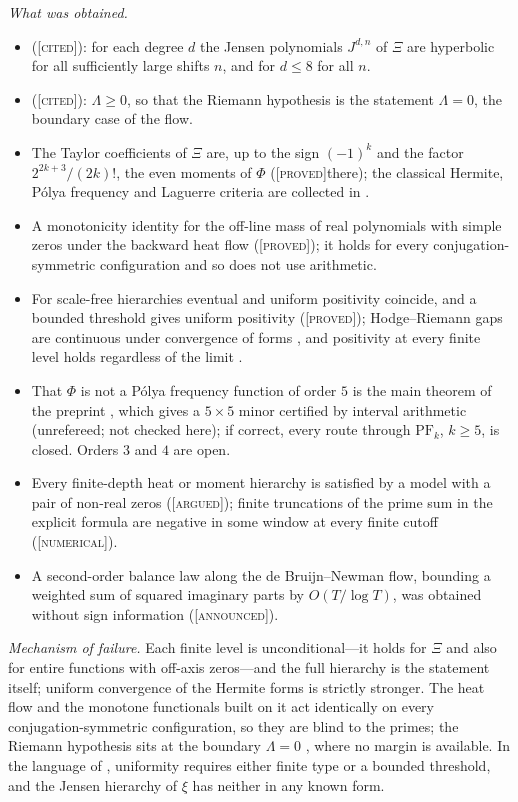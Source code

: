 \documentclass[11pt]{amsart}
\theoremstyle{definition}
\theoremstyle{remark}
\numberwithin{equation}{section}
\newcommand{\stag}[1]{\textsc{[#1]}}
\newcommand{\PROVED}{\stag{proved}}
\newcommand{\CITED}{\stag{cited}}
\newcommand{\ARGUED}{\stag{argued}}
\newcommand{\NUM}{\stag{numerical}}
\newcommand{\ANNOUNCED}{\stag{announced}}
\newcommand{\entry}[1]{\par\smallskip\noindent\textit{#1.}\enspace}
\begin{document}
\entry{What was obtained}
\begin{itemize}[leftmargin=2em]
\item \cite{GORZ2019} (\CITED): for each degree $d$ the Jensen polynomials $J^{d,n}$ of $\Xi$ are
  hyperbolic for all sufficiently large shifts $n$, and for $d\le8$ for all $n$.
\item \cite{RodgersTao2020} (\CITED): $\Lambda\ge0$, so that the Riemann hypothesis is the
  statement $\Lambda=0$, the boundary case of the flow.
\item The Taylor coefficients of $\Xi$ are, up to the sign $(-1)^k$ and the factor
  $2^{2k+3}/(2k)!$, the even moments of $\Phi$ \cite[\S3]{P14} (\PROVED there); the classical Hermite, P\'olya frequency and Laguerre criteria
  are collected in \cite{P14}.
\item A monotonicity identity for the off-line mass of real polynomials with simple zeros under the
  backward heat flow \cite[Theorem~2.1]{P13} (\PROVED); it holds for every conjugation-symmetric
  configuration and so does not use arithmetic.
\item For scale-free hierarchies eventual and uniform positivity coincide, and a bounded threshold
  gives uniform positivity \cite[Theorem~3.1]{P15} (\PROVED); Hodge--Riemann gaps are continuous
  under convergence of forms \cite[Lemma~8.2]{P15}, and positivity at every finite level holds
  regardless of the limit \cite[Corollary~8.3]{P15}.
\item That $\Phi$ is not a P\'olya frequency function of order $5$ is the main theorem of the
  preprint \cite{Michalowski2026}, which gives a $5\times5$ minor certified by interval arithmetic
  (unrefereed; not checked here); if correct, every route through
  $\mathrm{PF}_k$, $k\ge5$, is closed. Orders $3$ and $4$ are open.
\item Every finite-depth heat or moment hierarchy is satisfied by a model with a pair of non-real
  zeros (\ARGUED); finite truncations of the prime sum in the explicit formula are negative in some
  window at every finite cutoff (\NUM).
\item A second-order balance law along the de Bruijn--Newman flow, bounding a weighted sum of
  squared imaginary parts by $O(T/\log T)$, was obtained without sign information (\ANNOUNCED).
\end{itemize}

\entry{Mechanism of failure} Each finite level is unconditional---it holds for $\Xi$ and also for
entire functions with off-axis zeros---and the full hierarchy is the statement itself; uniform
convergence of the Hermite forms is strictly stronger. The heat flow and the monotone functionals
built on it act identically on every conjugation-symmetric configuration, so they are blind to the
primes; the Riemann hypothesis sits at the boundary $\Lambda=0$ \cite{RodgersTao2020}, where no
margin is available. In the language of \cite{P15}, uniformity requires either finite type or a
bounded threshold, and the Jensen hierarchy of $\xi$ has neither in any known form.
\end{document}
